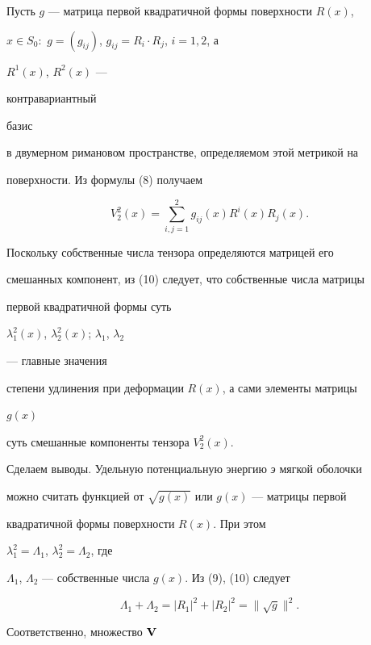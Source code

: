 Пусть $g$ --- матрица первой квадратичной формы поверхности $R(x)$,


$x\in S_0:$ $g=(g_{ij})$, $g_{ij}=R_i\cdot R_j$, $i=1,2$, а


$R^1(x)$, $R^2(x)$ ---


контравариантный


базис


в двумерном римановом пространстве, определяемом этой метрикой на


поверхности. Из формулы (8) получаем


\begin{equation}


V^2_2(x)=\sum^2_{i,j=1}g_{ij}(x)R^i(x)R_j(x).


\end{equation}


Поскольку собственные числа тензора определяются матрицей его


смешанных компонент, из (10) следует, что собственные числа матрицы


первой квадратичной формы суть


$\lambda^2_1(x)$, $\lambda^2_2(x)$; $\lambda_1$, $\lambda_2$


--- главные значения


степени удлинения при деформации $R(x)$, а сами элементы матрицы


$g(x)$


суть смешанные компоненты тензора $V^2_2(x)$.





Сделаем выводы. Удельную потенциальную энергию {\it э} мягкой оболочки


можно считать функцией от $\sqrt{g(x)}$ или $g(x)$ --- матрицы первой


квадратичной формы поверхности $R(x)$. При этом


$\lambda^2_1=\Lambda_1$, $\lambda^2_2=\Lambda_2$, где


$\Lambda_1$, $\Lambda_2$ --- собственные числа $g(x)$. Из (9), (10) следует


\begin{equation}


\Lambda_1+\Lambda_2=|R_1|^2+|R_2|^2=\|\sqrt{g}\|^2.


\end{equation}





Соответственно, множество $\bold V$


